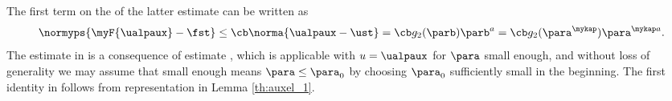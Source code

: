 \documentclass[10pt]{article}
\theoremstyle{definition}
\begin{document}
%
The first term on the \rhs of the latter estimate can be written as
%
\begin{align}
\normyps{\myF{\ualpaux} - \fst }
\le \cb \norma{\ualpaux - \ust}
= \cb g_2(\parb)\parb^{a}
= \cb g_2(\para^{\mykap})\para^{\mykap a}.
\label{eq:upardel_lemma_b}
\end{align}
%
The estimate in  is a consequence of estimate , which is applicable with $ u = \ualpaux $ for $ \para $ small enough, and without loss of generality we may assume that small enough means $ \para \le \para_0 $ by choosing $ \para_0 $ sufficiently small in the beginning. The first identity in  follows from representation  in Lemma \ref{th:auxel_1}.
\end{document}
